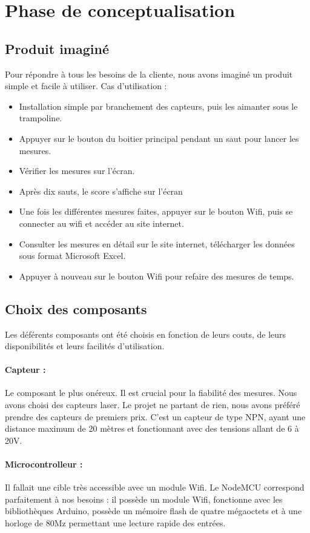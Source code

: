 \section{Phase de conceptualisation}
\subsection{Produit imaginé}
Pour répondre à tous les besoins de la cliente, nous avons imaginé un produit simple et facile à utiliser. Cas d'utilisation :
\begin{itemize}
    \item Installation simple par branchement des capteurs, puis les aimanter sous le trampoline.
    \item Appuyer sur le bouton du boitier principal pendant un saut pour lancer les mesures.
    \item Vérifier les mesures sur l'écran.
    \item Après dix sauts, le score s'affiche sur l'écran
    \item Une fois les différentes mesures faites, appuyer sur le bouton Wifi, puis se connecter au wifi et accéder au site internet.
    \item Consulter les mesures en détail sur le site internet, télécharger les données sous format Microsoft Excel.
    \item Appuyer à nouveau sur le bouton Wifi pour refaire des mesures de temps.
\end{itemize}

\subsection{Choix des composants}
Les déférents composants ont été choisis en fonction de leurs couts, de leurs disponibilités et leurs facilités d'utilisation.
\paragraph{Capteur :}
Le composant le plus onéreux. Il est crucial pour la fiabilité des mesures. Nous avons choisi des capteurs laser. Le projet ne partant de rien, nous avons préféré prendre des capteurs de premiers prix. C'est un capteur de type NPN, ayant une distance maximum de 20 mètres et fonctionnant avec des tensions allant de 6 à 20V.

\paragraph{Microcontrolleur :}
Il fallait une cible très accessible avec un module Wifi. Le NodeMCU correspond parfaitement à nos besoins : il possède un module Wifi, fonctionne avec les bibliothèques Arduino, possède un mémoire flash de quatre mégaoctets et à une horloge de 80Mz permettant une lecture rapide des entrées.

